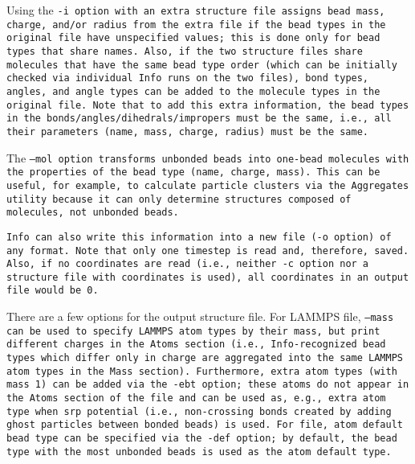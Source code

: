 Using the \tt{-i} option with an extra structure file assigns bead mass, charge,
and/or radius from the extra file if the bead types in the original file have
unspecified values; this is done only for bead types that share names. Also, if
the two structure files share molecules that have the same bead type order
(which can be initially checked via individual \tt{Info} runs on the two files),
bond types, angles, and angle types can be added to the molecule types in the
original file. Note that to add this extra information, the bead types in the
bonds/angles/dihedrals/impropers must be the same, i.e., all their parameters
(name, mass, charge, radius) must be the same.

The \tt{--mol} option transforms unbonded beads into one-bead molecules with the
properties of the bead type (name, charge, mass). This can be useful, for
example, to calculate particle clusters via the \tt{Aggregates} utility because
it can only determine structures composed of molecules, not unbonded beads.

\tt{Info} can also write this information into a new file (\tt{-o} option) of
any format. Note that only one timestep is read and, therefore, saved. Also, if
no coordinates are read (i.e., neither \tt{-c} option nor a structure file with
coordinates is used), all coordinates in an output file would be 0.


There are a few options for the output structure file. For LAMMPS \data file,
\tt{--mass} can be used to specify LAMMPS atom types by their mass, but print
different charges in the \tt{Atoms} section (i.e., \tt{Info}-recognized bead
types which differ only in charge are aggregated into the same LAMMPS atom types
in the \tt{Mass} section). Furthermore, extra atom types (with mass 1) can be
added via the \tt{-ebt} option; these atoms do not appear in the \tt{Atoms}
section of the \data file and can be used as, e.g., extra atom type when srp
potential (i.e., non-crossing bonds created by adding ghost particles between
bonded beads) is used. For \vtsf file, \tt{atom default} bead type can be
specified via the \tt{-def} option; by default, the bead type with the most
unbonded beads is used as the \tt{atom default} type.

